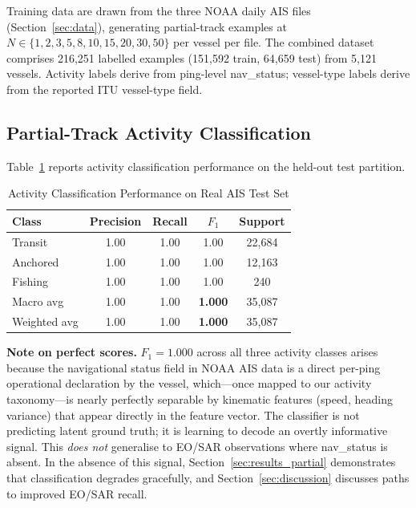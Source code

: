 \documentclass[journal]{IEEEtran}
\begin{document}
Training data are drawn from the three NOAA daily AIS files
(Section~\ref{sec:data}), generating partial-track examples at
$N \in \{1, 2, 3, 5, 8, 10, 15, 20, 30, 50\}$ per vessel per file.
The combined dataset comprises 216,251 labelled examples (151,592 train,
64,659 test) from 5,121 vessels.
Activity labels derive from ping-level nav\_status; vessel-type labels
derive from the reported ITU vessel-type field.

\subsection{Partial-Track Activity Classification}

Table~\ref{tab:activity_results} reports activity classification
performance on the held-out test partition.

\begin{table}[!t]
  \caption{Activity Classification Performance on Real AIS Test Set}
  \label{tab:activity_results}
  \centering
  \begin{tabular}{lcccc}
    \toprule
    Class & Precision & Recall & $F_1$ & Support \\
    \midrule
    Transit     & 1.00 & 1.00 & 1.00 & 22,684 \\
    Anchored    & 1.00 & 1.00 & 1.00 & 12,163 \\
    Fishing     & 1.00 & 1.00 & 1.00 & 240 \\
    \midrule
    Macro avg   & 1.00 & 1.00 & \textbf{1.000} & 35,087 \\
    Weighted avg & 1.00 & 1.00 & \textbf{1.000} & 35,087 \\
    \bottomrule
  \end{tabular}
\end{table}

\textbf{Note on perfect scores.}
$F_1 = 1.000$ across all three activity classes arises because the
navigational status field in NOAA AIS data is a direct per-ping
operational declaration by the vessel, which—once mapped to our activity
taxonomy—is nearly perfectly separable by kinematic features (speed,
heading variance) that appear directly in the feature vector.
The classifier is not predicting latent ground truth; it is learning to
decode an overtly informative signal.
%
This \emph{does not} generalise to EO/SAR observations where nav\_status
is absent. In the absence of this signal, Section~\ref{sec:results_partial}
demonstrates that classification degrades gracefully, and
Section~\ref{sec:discussion} discusses paths to improved EO/SAR recall.
\end{document}
